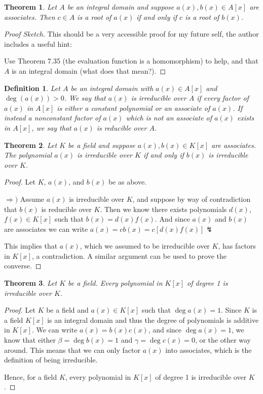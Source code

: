 \documentclass[letterpaper, 12pt]{article}
\newtheorem{defn}{Definition}
\newtheorem{thm}{Theorem}
\begin{document}
			\setcounter{thm}{4}
			\begin{thm}
			Let $A$ be an integral domain and suppose $a(x), b(x) \in A[x]$ are associates. 
			Then $c \in A$ is a root of $a(x)$ if and only if $c$ is a root of $b(x)$.
			\end{thm}
			\color{blue}
			\begin{proof}[Proof Sketch]
			This should be a very accessible proof for my future self, the author includes a useful hint:

			Use Theorem 7.35 (the evaluation function is a homomorphism) to help, and that $A$ is an integral domain (what does that mean?).
			\end{proof}
			\color{black}

			\setcounter{defn}{6}
			\begin{defn}
			Let $A$ be an integral domain with $a(x) \in A[x]$ and $\deg(a(x))>0$.
			We say that $a(x)$ is irreducible over $A$ if every factor of $a(x)$ in $A[x]$ is either a constant polynomial or an associate of $a(x)$.
			If instead a nonconstant factor of $a(x)$ which is not an associate of $a(x)$ exists in $A[x]$, we say that $a(x)$ is reducible over $A$.
			\end{defn}

			\setcounter{thm}{7}
			\begin{thm}
			Let $K$ be a field and suppose $a(x), b(x) \in K[x]$ are associates. 
			The polynomial $a(x)$ is irreducible over $K$ if and only if $b(x)$ is irreducible over $K$.
			\end{thm}
			\color{blue}
			\begin{proof}
			Let $K$, $a(x)$, and $b(x)$ be as above.

			$\Rightarrow)$ Assume $a(x)$ is irreducible over $K$, and suppose by way of contradiction that $b(x)$ is reducible over $K$.
			Then we know there exists polynomials $d(x)$,$f(x) \in K[x]$ such that $b(x) = d(x)f(x)$.
			And since $a(x)$ and $b(x)$ are associates we can write $a(x) = cb(x) = c[d(x)f(x)] \lightning$
			
			This implies that $a(x)$, which we assumed to be irreducible over $K$, has factors in $K[x]$, a contradiction.
			A similar argument can be used to prove the converse.
			\end{proof}
			\color{black}

			\begin{thm}
			Let $K$ be a field. 
			Every polynomial in $K[x]$ of degree 1 is irreducible over $K$.
			\end{thm}
			\color{blue}
			\begin{proof}
			Let $K$ be a field and $a(x) \in K[x]$ such that $\deg{a(x)} = 1$.
			Since $K$ is a field $K[x]$ is an integral domain and thus the degree of polynomials is additive in $K[x]$.
			We can write $a(x) = b(x)c(x)$, and since $\deg{a(x)} = 1$, we know that either $\beta = \deg{b(x)} = 1$ and $\gamma = \deg{c(x)} = 0$, or the other way around.
			This means that we can only factor $a(x)$ into associates, which is the definition of being irreducible.

			Hence, for a field $K$, every polynomial in $K[x]$ of degree 1 is irreducible over $K$.
			\end{proof}
			\color{black}
\end{document}
